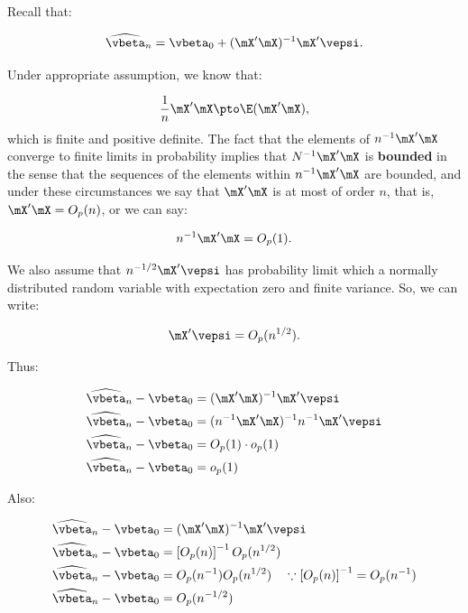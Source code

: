 \begin{example}
Recall that:

\begin{equation*}
  \widehat{\vbeta}_n = \vbeta_0 + (\mX'\mX)^{-1}\mX'\vepsi.
\end{equation*}

Under appropriate assumption, we know that:

\begin{equation*}
  \frac{1}{n}\mX'\mX\pto \E(\mX'\mX),
\end{equation*}
%
which is finite and positive definite. The fact that the elements of $n^{-1}\mX'\mX$ converge to finite limits in probability implies that $N^{-1}\mX'\mX$ is \textbf{bounded} in the sense that the sequences of the elements within $n^{-1}\mX'\mX$ are bounded, and under these circumstances we say that $\mX'\mX$ is at most of order $n$, that is, $\mX'\mX = O_p(n)$, or we can say:

\begin{equation*}
n^{-1}\mX'\mX = O_p(1).
\end{equation*}

We also assume that $n^{-1/2} \mX'\vepsi$ has probability limit which a normally distributed random variable with expectation zero and finite variance. So, we can write:

\begin{equation*}
\mX'\vepsi = O_p(n^{1/2}).
\end{equation*}

Thus:


\begin{equation*}
  \begin{aligned}
\widehat{\vbeta}_n - \vbeta_0 & =  (\mX'\mX)^{-1}\mX'\vepsi  \\
\widehat{\vbeta}_n - \vbeta_0 & =  (n^{-1}\mX'\mX)^{-1}n^{-1}\mX'\vepsi  \\
\widehat{\vbeta}_n - \vbeta_0 & = O_p(1) \cdot o_p(1) \\
\widehat{\vbeta}_n - \vbeta_0 & = o_p(1)
\end{aligned}
\end{equation*}

Also:

\begin{equation*}
  \begin{aligned}
\widehat{\vbeta}_n - \vbeta_0 & =  (\mX'\mX)^{-1}\mX'\vepsi  \\
\widehat{\vbeta}_n - \vbeta_0 & =  \left[O_p(n)\right]^{-1}O_p(n^{1/2}) \\
\widehat{\vbeta}_n - \vbeta_0 & =  O_p(n^{-1})O_p(n^{1/2}) \quad \because \left[O_p(n)\right]^{-1}= O_p(n^{-1})\\
\widehat{\vbeta}_n - \vbeta_0 & =  O_p(n^{-1/2})\\
\end{aligned}
\end{equation*}
%


\end{example}
